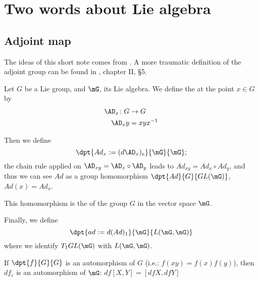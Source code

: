 \section{Two words about Lie algebra}


\subsection{Adjoint map}

The ideas of this short note comes from \cite{Lie}. A more traumatic definition of the adjoint group can be found in \cite{Helgason}, chapter II, \S 5.

\begin{definition}
	Let $G$ be a Lie group, and $\mG$, its Lie algebra. We define the  at the point $x\in G$ by
	\begin{equation}
		\begin{aligned}
			\AD_x\colon G & \to G     \\
			\AD_xy        & =xyx^{-1}
		\end{aligned}
	\end{equation}
\end{definition}

Then we define
\[
	\dpt{Ad_x:=(d\AD_x)_e}{\mG}{\mG};
\]
the chain rule applied on $\AD_{xy}=\AD_x\circ\AD_y$ leads to $Ad_{xy}=Ad_x\circ Ad_y$, and thus we can see $Ad$ as a group homomorphism $\dpt{Ad}{G}{GL(\mG)}$, $Ad(x)=Ad_x$.

\begin{definition}
	This homomorphism is the  of the group $G$ in the vector space $\mG$.
\end{definition}


Finally, we define
\[
	\dpt{ad:=d(Ad)_1}{\mG}{L(\mG,\mG)}
\]
where we identify $T_1GL(\mG)$ with $L(\mG,\mG)$.

\begin{lemma}\label{LEMooEALFooJOeOgk}
	If $\dpt{f}{G}{G}$ is an automorphism of $G$ (i.e.: $f(xy)=f(x)f(y)$), then $df_e$ is an automorphism of $\mG$: $df[X,Y]=[df X,dfY]$
\end{lemma}

